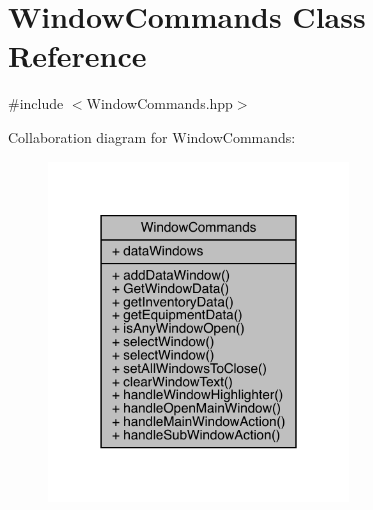\hypertarget{class_window_commands}{}\section{Window\+Commands Class Reference}
\label{class_window_commands}


{\ttfamily \#include $<$Window\+Commands.\+hpp$>$}



Collaboration diagram for Window\+Commands\+:
\nopagebreak
\begin{figure}[H]
\begin{center}
\leavevmode
\includegraphics[width=226pt]{class_window_commands__coll__graph}
\end{center}
\end{figure}
